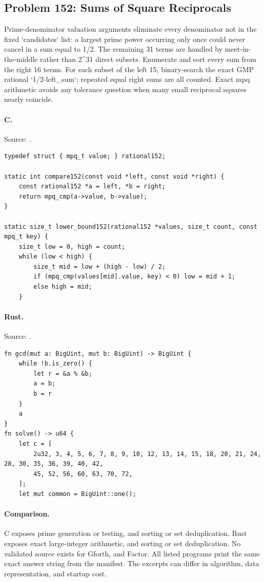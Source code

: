 \subsection{Problem 152: Sums of Square Reciprocals}
\label{walkthrough:p152}
Prime-denominator valuation arguments eliminate every denominator not in the fixed `candidates` list: a largest prime power occurring only once could never cancel in a sum equal to 1/2. The remaining 31 terms are handled by meet-in-the-middle rather than 2\textasciicircum{}31 direct subsets. Enumerate and sort every sum from the right 16 terms. For each subset of the left 15, binary-search the exact GMP rational `1/2-left\_sum`; repeated equal right sums are all counted. Exact mpq arithmetic avoids any tolerance question when many small reciprocal squares nearly coincide.

\paragraph{C.} Source: .
\begin{lstlisting}
typedef struct { mpq_t value; } rational152;

static int compare152(const void *left, const void *right) {
    const rational152 *a = left, *b = right;
    return mpq_cmp(a->value, b->value);
}

static size_t lower_bound152(rational152 *values, size_t count, const mpq_t key) {
    size_t low = 0, high = count;
    while (low < high) {
        size_t mid = low + (high - low) / 2;
        if (mpq_cmp(values[mid].value, key) < 0) low = mid + 1;
        else high = mid;
    }
\end{lstlisting}

\paragraph{Rust.} Source: .
\begin{lstlisting}
fn gcd(mut a: BigUint, mut b: BigUint) -> BigUint {
    while !b.is_zero() {
        let r = &a % &b;
        a = b;
        b = r
    }
    a
}
fn solve() -> u64 {
    let c = [
        2u32, 3, 4, 5, 6, 7, 8, 9, 10, 12, 13, 14, 15, 18, 20, 21, 24, 28, 30, 35, 36, 39, 40, 42,
        45, 52, 56, 60, 63, 70, 72,
    ];
    let mut common = BigUint::one();
\end{lstlisting}

\paragraph{Comparison.}
C exposes prime generation or testing, and sorting or set deduplication. Rust exposes exact large-integer arithmetic, and sorting or set deduplication.
No validated source exists for Gforth, and Factor.
All listed programs print the same exact answer string from the manifest. The excerpts can differ in algorithm, data representation, and startup cost.

